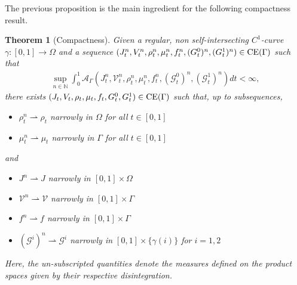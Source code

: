 \documentclass{article}
\def\calA{{\mathcal A}} \def\calB{{\mathcal B}} \def\calC{{\mathcal C}}
\newtheorem{theorem}{Theorem}[section]
\begin{document}
The previous proposition is the main ingredient for the following compactness result.
\begin{theorem}[Compactness]\label{thm:compact}
Given a regular, non self-intersecting $C^1$-curve $\gamma : [0,1] \rightarrow \Omega$ and a sequence $(J_t^n,V_t^n,\rho_t^n,\mu_t^n,f_t^n,(G_t^0)^n,(G_t^1)^n) \in {\rm CE}(\Gamma)$ such that 
\begin{align*}
    \sup_{n\in \mathbb{N}} \int_0^1 \calA_\Gamma(J_t^n,\mathcal{V}_t^n,\rho_t^n,\mu_t^n,f_t^n,(\mathcal{G}^0_t)^n,(\mathcal{G}_t^1)^n)dt < \infty,
\end{align*}
there exists $(J_t,V_t,\rho_t,\mu_t,f_t, G_t^0,G_t^1) \in {\rm CE}(\Gamma)
$ such that, up to subsequences, 
\begin{itemize}
    \item [i)] $\rho^n_t \rightharpoonup \rho_t$ narrowly in $\Omega$ for all $t \in [0,1]$
    \item [ii)] $\mu^n_t \rightharpoonup \mu_t$ narrowly in $\Gamma$ for all $t \in [0,1]$
\end{itemize}
and
\begin{itemize}
    \item [iii)] $J^n \rightharpoonup J$  narrowly in $[0,1] \times \Omega$
    \item [iv)] $\mathcal{V}^n \rightharpoonup \mathcal{V}$ narrowly in $[0,1] \times \Gamma$
    \item [v)] $f^n  \rightharpoonup f$ narrowly in $[0,1] \times \Gamma$
    \item [vi)] $(\mathcal{G}^i)^n \rightharpoonup \mathcal{G}^i$ narrowly in $[0,1] \times \{\gamma(i)\}$ for $i=1,2$
\end{itemize}
Here, the un-subscripted quantities denote the measures defined on the product spaces given by their respective disintegration.

\end{theorem}
\end{document}

